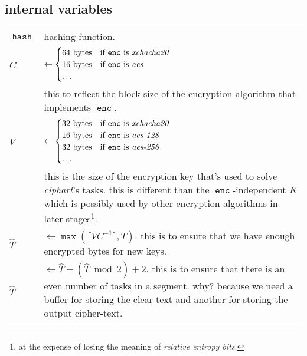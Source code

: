 \documentclass[twocolumn]{article}
\DeclareMathOperator{\enc}{\texttt{enc}}
\DeclareMathOperator{\maxf}{\texttt{max}}
\DeclareMathOperator{\hash}{\texttt{hash}}
\begin{document}
\subsection{internal variables}
\begin{tabularx}{\columnwidth}{lX}
    $\hash$ & hashing function.\\
    $C$         & $\gets \begin{cases}
                        64 \text{ bytes} & \text{if $\enc$ is
                                            \emph{xchacha20}}\\
                        16 \text{ bytes} & \text{if $\enc$ is \emph{aes}}\\
                        \ldots & \\
                     \end{cases}$\\
                & this to reflect the block size of the encryption
                    algorithm that implements $\enc$.\\
    $V$ & $\gets \begin{cases}
                        32 \text{ bytes} & \text{if $\enc$ is
                                            \emph{xchacha20}}\\
                        16 \text{ bytes} & \text{if $\enc$ is
                            \emph{aes-128}}\\
                        32 \text{ bytes} & \text{if $\enc$ is
                            \emph{aes-256}}\\
                        \ldots & \\
                     \end{cases}$\\
                & this is the size of the encryption key that's used to
                    solve \emph{ciphart}'s tasks.  this is different than
                    the $\enc$-independent $K$ which is
                    possibly used by other encryption algorithms in later
                    stages\footnote{at the expense of losing the meaning of
                    \emph{relative entropy bits}.}.\\
    $\hat T$    & $\gets \maxf(\lceil V C^{-1}\rceil, T)$.  this
                    is to ensure that we have enough encrypted bytes for
                    new keys.\\
    $\hat T$    & $\gets \hat T - (\hat T \bmod 2) + 2$.  this is to ensure
                    that there is an even number of tasks in a segment.
                    why?  because we need a buffer for storing the
                    clear-text and another for storing the output
                    cipher-text.\\
\end{tabularx}
\end{document}
